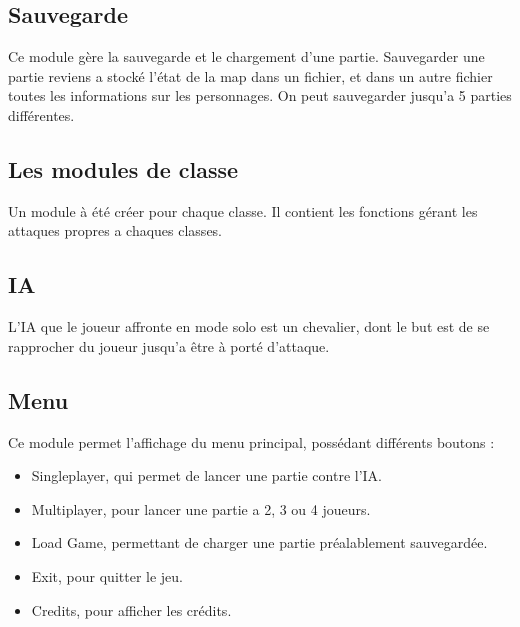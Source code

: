 \documentclass[a4paper, 11pt]{article}
\begin{document}
\subsection{Sauvegarde}
Ce module gère la sauvegarde et le chargement d'une partie. Sauvegarder une partie reviens a stocké l'état de la map dans un fichier, et dans un autre fichier toutes les informations sur les personnages.
On peut sauvegarder jusqu'a 5 parties différentes.

\subsection{Les modules de classe}
Un module à été créer pour chaque classe. Il contient les fonctions gérant les attaques propres a chaques classes.

\subsection{IA}
L'IA que le joueur affronte en mode solo est un chevalier, dont le but est de se rapprocher du joueur jusqu'a être à porté d'attaque.

\subsection{Menu}
Ce module permet l'affichage du menu principal, possédant différents boutons :
\begin{itemize}
\item Singleplayer, qui permet de lancer une partie contre l'IA.
\item Multiplayer, pour lancer une partie a 2, 3 ou 4 joueurs.
\item Load Game, permettant de charger une partie préalablement sauvegardée.
\item Exit, pour quitter le jeu.
\item Credits, pour afficher les crédits.
\end{itemize}
\end{document}
